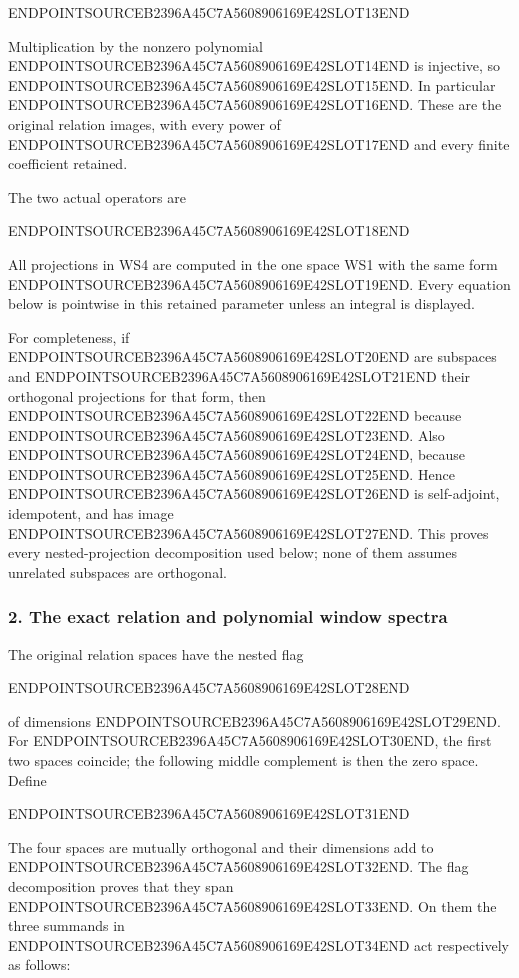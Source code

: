ENDPOINTSOURCEB2396A45C7A5608906169E42SLOT13END

Multiplication by the nonzero polynomial ENDPOINTSOURCEB2396A45C7A5608906169E42SLOT14END is injective, so ENDPOINTSOURCEB2396A45C7A5608906169E42SLOT15END. In particular ENDPOINTSOURCEB2396A45C7A5608906169E42SLOT16END. These are the original relation images, with every power of ENDPOINTSOURCEB2396A45C7A5608906169E42SLOT17END and every finite coefficient retained.

The two actual operators are

ENDPOINTSOURCEB2396A45C7A5608906169E42SLOT18END

All projections in WS4 are computed in the one space WS1 with the same form ENDPOINTSOURCEB2396A45C7A5608906169E42SLOT19END. Every equation below is pointwise in this retained parameter unless an integral is displayed.

For completeness, if ENDPOINTSOURCEB2396A45C7A5608906169E42SLOT20END are subspaces and ENDPOINTSOURCEB2396A45C7A5608906169E42SLOT21END their orthogonal projections for that form, then ENDPOINTSOURCEB2396A45C7A5608906169E42SLOT22END because ENDPOINTSOURCEB2396A45C7A5608906169E42SLOT23END. Also ENDPOINTSOURCEB2396A45C7A5608906169E42SLOT24END, because ENDPOINTSOURCEB2396A45C7A5608906169E42SLOT25END. Hence ENDPOINTSOURCEB2396A45C7A5608906169E42SLOT26END is self-adjoint, idempotent, and has image ENDPOINTSOURCEB2396A45C7A5608906169E42SLOT27END. This proves every nested-projection decomposition used below; none of them assumes unrelated subspaces are orthogonal.

\subsubsection{2. The exact relation and polynomial window spectra}\label{endpoint-window_review--the-exact-relation-and-polynomial-window-spectra}

The original relation spaces have the nested flag

ENDPOINTSOURCEB2396A45C7A5608906169E42SLOT28END

of dimensions ENDPOINTSOURCEB2396A45C7A5608906169E42SLOT29END. For ENDPOINTSOURCEB2396A45C7A5608906169E42SLOT30END, the first two spaces coincide; the following middle complement is then the zero space. Define

ENDPOINTSOURCEB2396A45C7A5608906169E42SLOT31END

The four spaces are mutually orthogonal and their dimensions add to ENDPOINTSOURCEB2396A45C7A5608906169E42SLOT32END. The flag decomposition proves that they span ENDPOINTSOURCEB2396A45C7A5608906169E42SLOT33END. On them the three summands in ENDPOINTSOURCEB2396A45C7A5608906169E42SLOT34END act respectively as follows:

